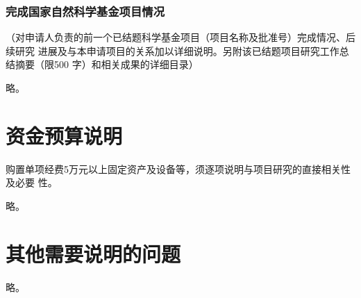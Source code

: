 \documentclass[subfig,boldtoc]{mynsfc}
\begin{document}
\section{完成国家自然科学基金项目情况}
\label{sec:prev-nsfc}

\begin{hcomment}
  （对申请人负责的前一个已结题科学基金项目（项目名称及批准号）完成情况、后续研究
  进展及与本申请项目的关系加以详细说明。另附该已结题项目研究工作总结摘要（限500
  字）和相关成果的详细目录）
\end{hcomment}

略。

\part{资金预算说明}
\label{sec:finance}

\begin{hcomment}
  购置单项经费5万元以上固定资产及设备等，须逐项说明与项目研究的直接相关性及必要
  性。
\end{hcomment}

略。

\part{其他需要说明的问题}
\label{sec:others}

略。
\end{document}
